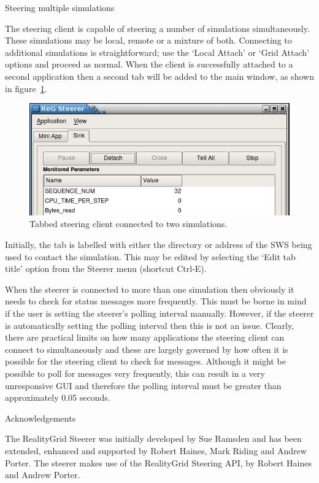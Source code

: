 \documentclass[a4paper,twoside]{article}
\begin{document}
\begin{section}{Steering multiple simulations}
\label{sec:multiple_sims}

The steering client is capable of steering a number of simulations
simultaneously.  These simulations may be local, remote or a mixture
of both.  Connecting to additional simulations is straightforward; use
the `Local Attach' or `Grid Attach' options and proceed as normal.  When
the client is successfully attached to a second application then a
second tab will be added to the main window, as shown in
figure~\ref{fig:tabbed}.

\begin{figure}
\centerline{\includegraphics{tabbed_steerer.png}}
\caption{Tabbed steering client connected to two simulations.}
\label{fig:tabbed}
\end{figure}

Initially, the tab is labelled with either the directory or address of the
SWS being used to contact the simulation.  This may be edited by
selecting the `Edit tab title' option from the Steerer menu (shortcut
Ctrl-E).

When the steerer is connected to more than one simulation then
obviously it needs to check for status messages more frequently.  This
must be borne in mind if the user is setting the steerer's polling
interval manually.  However, if the steerer is automatically setting
the polling interval then this is not an issue.  Clearly, there are
practical limits on how many applications the steering client can
connect to simultaneously and these are largely governed by how often
it is possible for the steering client to check for messages.
Although it might be possible to poll for messages very frequently,
this can result in a very unresponsive GUI and therefore the polling
interval must be greater than approximately 0.05 seconds.

\end{section} %


\begin{section}{Acknowledgements}

The RealityGrid Steerer was initially developed by Sue Ramsden and has
been extended, enhanced and supported by Robert Haines, Mark Riding
and Andrew Porter. The steerer makes use of the RealityGrid Steering
API, by Robert Haines and Andrew Porter.

\end{section}
\end{document}
